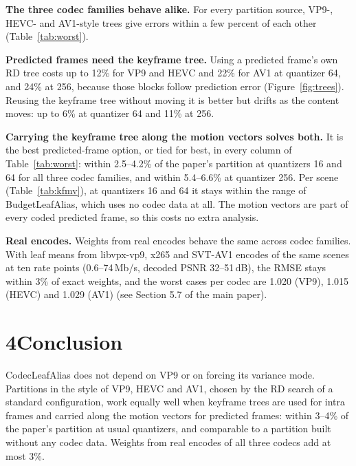 \documentclass[10pt]{article}
\begin{document}
\textbf{The three codec families behave alike.} For every partition source, VP9-, HEVC- and AV1-style trees give errors within a few percent of each other (Table~\ref{tab:worst}).

\textbf{Predicted frames need the keyframe tree.} Using a predicted frame's own RD tree costs up to 12\% for VP9 and HEVC and 22\% for AV1 at quantizer 64, and 24\% at 256, because those blocks follow prediction error (Figure~\ref{fig:trees}). Reusing the keyframe tree without moving it is better but drifts as the content moves: up to 6\% at quantizer 64 and 11\% at 256.

\textbf{Carrying the keyframe tree along the motion vectors solves both.} It is the best predicted-frame option, or tied for best, in every column of Table~\ref{tab:worst}: within 2.5--4.2\% of the paper's partition at quantizers 16 and 64 for all three codec families, and within 5.4--6.6\% at quantizer 256. Per scene (Table~\ref{tab:kfmv}), at quantizers 16 and 64 it stays within the range of BudgetLeafAlias, which uses no codec data at all. The motion vectors are part of every coded predicted frame, so this costs no extra analysis.

\textbf{Real encodes.} Weights from real encodes behave the same across codec families. With leaf means from libvpx-vp9, x265 and SVT-AV1 encodes of the same scenes at ten rate points (0.6--74\,Mb/s, decoded PSNR 32--51\,dB), the RMSE stays within 3\% of exact weights, and the worst cases per codec are 1.020 (VP9), 1.015 (HEVC) and 1.029 (AV1) (see Section 5.7 of the main paper).

\section*{4\quad Conclusion}

CodecLeafAlias does not depend on VP9 or on forcing its variance mode. Partitions in the style of VP9, HEVC and AV1, chosen by the RD search of a standard configuration, work equally well when keyframe trees are used for intra frames and carried along the motion vectors for predicted frames: within 3--4\% of the paper's partition at usual quantizers, and comparable to a partition built without any codec data. Weights from real encodes of all three codecs add at most 3\%.
\end{document}
